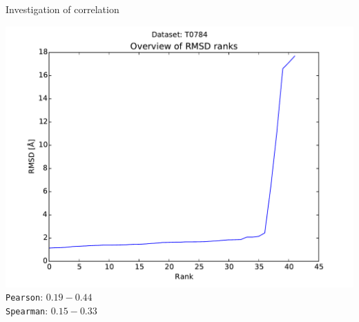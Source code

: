 \begin{frame}{Investigation of correlation}
    \begin{center}
        \includegraphics[width=.7\textwidth]{../results/rank_T0784}\\

        \texttt{Pearson}: $0.19-0.44$\\
        \texttt{Spearman}: $0.15-0.33$\\
    \end{center}
\end{frame}
